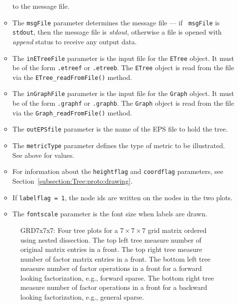 \begin{enumerate}
\begin{itemize}
to the message file.
\item
The {\tt msgFile} parameter determines the message file --- if {\tt
msgFile} is {\tt stdout}, then the message file is {\it stdout},
otherwise a file is opened with {\it append} status to receive any
output data.
\item
The {\tt inETreeFile} parameter is the input file for the {\tt ETree}
object. It must be of the form {\tt *.etreef} or {\tt *.etreeb}.
The {\tt ETree} object is read from the file via the
{\tt ETree\_readFromFile()} method.
\item
The {\tt inGraphFile} parameter is the input file for the {\tt Graph}
object. It must be of the form {\tt *.graphf} or {\tt *.graphb}.
The {\tt Graph} object is read from the file via the
{\tt Graph\_readFromFile()} method.
\item
The {\tt outEPSfile} parameter is the name of the EPS file 
to hold the tree.
\item
The {\tt metricType} parameter defines the type of metric to be
illustrated. See above for values.
\item
For information about the {\tt heightflag} and {\tt coordflag}
parameters, see Section~\ref{subsection:Tree:proto:drawing}.
\item
If {\tt labelflag = 1}, the node ids are written on the nodes
in the two plots.
\item
The {\tt fontscale} parameter is the font size when labels are
drawn.
\end{itemize}
\begin{figure}[htbp]
\caption{{\sc GRD7x7x7}: Four tree plots for a $7 \times 7 \times 7$
grid matrix ordered using nested dissection.
The top left tree measure number of original matrix entries in a front.
The top right tree measure number of factor matrix entries in a front.
The bottom left tree measure number of factor operations in a front
for a forward looking factorization, e.g., forward sparse.
The bottom right tree measure number of factor operations in a front
for a backward looking factorization, e.g., general sparse.}
\label{fig-GRD7x7x7-metrics}
\begin{center}
\par
{}
\end{center}

\end{figure}
\end{enumerate}
